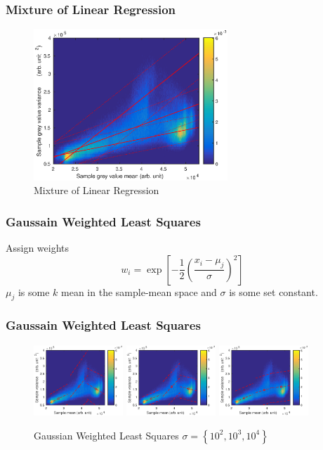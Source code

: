 \documentclass{beamer}
\begin{document}
\begin{frame}
\frametitle{Mixture of Linear Regression}
\begin{figure}
	\includegraphics[width=0.65\textwidth]{figures/meanVar/mixture_histogram.eps}
	\caption{Mixture of Linear Regression}
\end{figure}
\end{frame}

\begin{frame}
\frametitle{Gaussain Weighted Least Squares}
Assign weights
\begin{equation}
w_i=\exp\left[-\frac{1}{2}\left(\frac{x_i-\mu_j}{\sigma}\right)^2\right]
\end{equation}
$\mu_j$ is some $k$ mean in the sample-mean space and $\sigma$ is some set constant.
\end{frame}

\begin{frame}
\frametitle{Gaussain Weighted Least Squares}
\begin{figure}
	\includegraphics[width=0.3\textwidth]{figures/meanVar/gaussian_1.eps}
	\includegraphics[width=0.3\textwidth]{figures/meanVar/gaussian_2.eps}
	\includegraphics[width=0.3\textwidth]{figures/meanVar/gaussian_3.eps}
	\caption{Gaussian Weighted Least Squares $\sigma=\left\lbrace 10^2,10^3,10^4 \right\rbrace$}
\end{figure}
\end{frame}
\end{document}
